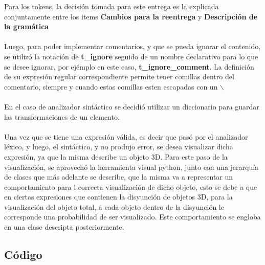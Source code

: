 Para los tokens, la decisión tomada para este entrega es la explicada conjuntamente entre los items \textbf{Cambios para la reentrega} y \textbf{Descripción de la gramática}
\\
\\
Luego, para poder implementar comentarios, y que se pueda ignorar el contenido, se utiliz\'o la notaci\'on de \textbf{t\_ignore} seguido de un nombre declarativo para lo que se desee ignorar, por ej\'emplo en este caso, \textbf{t\_ignore\_comment}.
La definición de su expresión regular correspondiente permite tener comillas dentro del comentario, siempre y cuando estas comillas esten escapadas con un $\backslash$
\\
\\
En el caso de analizador sint\'actico se decidi\'o utilizar un diccionario para guardar las transformaciones de un elemento.
\\
\\
Una vez que se tiene una expresi\'on v\'alida, es decir que pas\'o por el analizador l\'exico, y luego, el sint\'actico, y no produjo error, se desea visualizar dicha expresi\'on, ya que la misma describe un objeto 3D. Para este paso de la visualizaci\'on, se aprovech\'o la herramienta visual python, junto con una jerarqu\'ia de clases que m\'as adelante se describe, que la misma va a representar un comportamiento para l correcta visualizaci\'on de dicho objeto, esto se debe a que en ciertas expresiones que contienen la disyunci\'on de objetos 3D, para la visualizaci\'on del objeto total, a cada objeto dentro de la disyunci\'on le corresponde una probabilidad de ser visualizado. Este comportamiento se engloba en una clase descripta posteriormente.


\subsection{C\'odigo}

